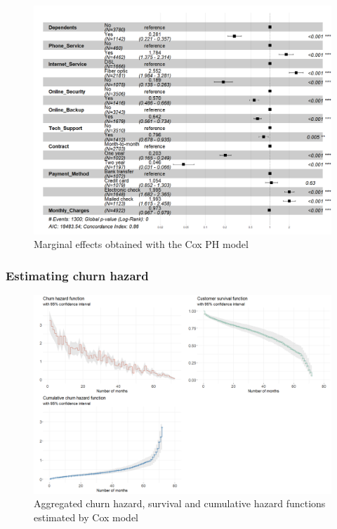 \documentclass[
]{book}
\begin{document}
\begin{figure}

{\centering \includegraphics[width=18.06in]{./imgs/cox_ggforest} 

}

\caption{Marginal effects obtained with the Cox PH model}\label{fig:coxmarginaleffects}
\end{figure}

\hypertarget{estimating-churn-hazard}{%
\subsubsection*{Estimating churn hazard}\label{estimating-churn-hazard}}

\begin{figure}

{\centering \includegraphics[width=20.83in]{./imgs/cox_data_viz} 

}

\caption{Aggregated churn hazard, survival and cumulative hazard functions estimated by Cox model}\label{fig:coxdataviz}
\end{figure}
\end{document}
